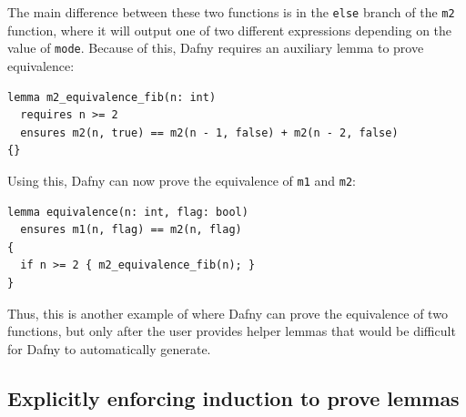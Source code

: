 \documentclass[a4paper, 11pt]{article}
\begin{document}
%
The main difference between these two functions is in the \lstinline|else| branch of the \lstinline|m2| function, where it will output one of two different expressions depending on the value of \lstinline|mode|. Because of this, Dafny requires an auxiliary lemma to prove equivalence:
\begin{lstlisting}[caption=Auxiliary Lemma for \lstinline|m2|]
lemma m2_equivalence_fib(n: int)
  requires n >= 2
  ensures m2(n, true) == m2(n - 1, false) + m2(n - 2, false)
{}
\end{lstlisting}
%
Using this, Dafny can now prove the equivalence of \lstinline|m1| and \lstinline|m2|:
\begin{lstlisting}[caption=Equivalence Lemma for \lstinline|m1| and \lstinline|m2|]
lemma equivalence(n: int, flag: bool)
  ensures m1(n, flag) == m2(n, flag)
{
  if n >= 2 { m2_equivalence_fib(n); }
}
\end{lstlisting}
%
Thus, this is another example of where Dafny can prove the equivalence of two functions, but only after the user provides helper lemmas that would be difficult for Dafny to automatically generate.

\subsection{Explicitly enforcing induction to prove lemmas}
\end{document}
